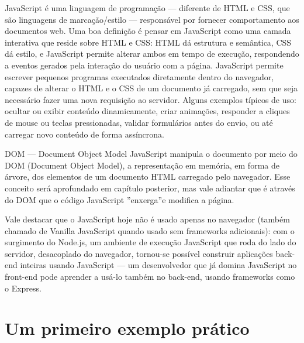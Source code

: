 JavaScript é uma linguagem de programação — diferente de HTML e CSS, que são linguagens de marcação/estilo — responsável por fornecer comportamento aos documentos web. Uma boa definição é pensar em JavaScript como uma camada interativa que reside sobre HTML e CSS: HTML dá estrutura e semântica, CSS dá estilo, e JavaScript permite alterar ambos em tempo de execução, respondendo a eventos gerados pela interação do usuário com a página. JavaScript permite escrever pequenos programas executados diretamente dentro do navegador, capazes de alterar o HTML e o CSS de um documento já carregado, sem que seja necessário fazer uma nova requisição ao servidor. Alguns exemplos típicos de uso: ocultar ou exibir conteúdo dinamicamente, criar animações, responder a cliques de mouse ou teclas pressionadas, validar formulários antes do envio, ou até carregar novo conteúdo de forma assíncrona.

\begin{infobox}{DOM — Document Object Model}
JavaScript manipula o documento por meio do DOM (Document Object Model), a representação em memória, em forma de árvore, dos elementos de um documento HTML carregado pelo navegador. Esse conceito será aprofundado em capítulo posterior, mas vale adiantar que é através do DOM que o código JavaScript ”enxerga”e modifica a página.
\end{infobox}

Vale destacar que o JavaScript hoje não é usado apenas no navegador (também chamado de Vanilla JavaScript quando usado sem frameworks adicionais): com o surgimento do Node.js, um ambiente de execução JavaScript que roda do lado do servidor, desacoplado do navegador, tornou-se possível construir aplicações back-end inteiras usando JavaScript — um desenvolvedor que já domina JavaScript no front-end pode aprender a usá-lo também no back-end, usando frameworks como o Express.

\section{Um primeiro exemplo prático}


